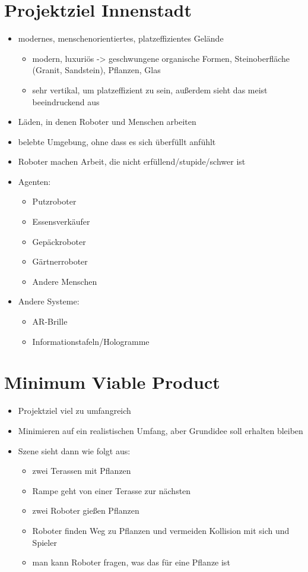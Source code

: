 
\section{Projektziel Innenstadt}

\begin{itemize}
\item modernes, menschenorientiertes, platzeffizientes Gelände
\begin{itemize}
\item modern, luxuriös -> geschwungene organische Formen, Steinoberfläche (Granit, Sandstein), Pflanzen, Glas
\item sehr vertikal, um platzeffizient zu sein, außerdem sieht das meist beeindruckend aus
\end{itemize}
\item Läden, in denen Roboter und Menschen arbeiten
\item belebte Umgebung, ohne dass es sich überfüllt anfühlt
\item Roboter machen Arbeit, die nicht erfüllend/stupide/schwer ist
\item Agenten:
\begin{itemize}
\item Putzroboter
\item Essensverkäufer
\item Gepäckroboter
\item Gärtnerroboter
\item Andere Menschen
\end{itemize}
\item Andere Systeme:
\begin{itemize}
\item AR-Brille
\item Informationstafeln/Hologramme
\end{itemize}
\end{itemize}

\section{Minimum Viable Product}

\begin{itemize}
\item Projektziel viel zu umfangreich
\item Minimieren auf ein realistischen Umfang, aber Grundidee soll erhalten bleiben
\item Szene sieht dann wie folgt aus:
\begin{itemize}
\item zwei Terassen mit Pflanzen
\item Rampe geht von einer Terasse zur nächsten
\item zwei Roboter gießen Pflanzen
\item Roboter finden Weg zu Pflanzen und vermeiden Kollision mit sich und Spieler
\item man kann Roboter fragen, was das für eine Pflanze ist
\end{itemize}
\end{itemize}